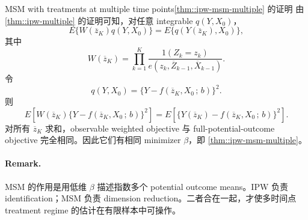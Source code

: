 \begin{exercisesolution}{MSM with treatments at multiple time points}{\cref{thm::ipw-msm-multiple} 的证明}
由 \cref{thm::ipw-multiple} 的证明可知，对任意 integrable $q(Y,X_0)$，
\[
E\{W(\overline z_K)q(Y,X_0)\}
=
E\{q(Y(\overline z_K),X_0)\},
\]
其中
\[
W(\overline z_K)
=
\prod_{k=1}^K
\frac{1(Z_k=z_k)}
{e(z_k,\overline Z_{k-1},\overline X_{k-1})}.
\]
令
\[
q(Y,X_0)=\{Y-f(\overline z_K,X_0\,;\,b)\}^2.
\]
则
\[
E\left[
W(\overline z_K)\{Y-f(\overline z_K,X_0\,;\,b)\}^2
\right]
=
E\left[
\{Y(\overline z_K)-f(\overline z_K,X_0\,;\,b)\}^2
\right].
\]
对所有 $\overline z_K$ 求和，observable weighted objective 与 full-potential-outcome objective 完全相同。因此它们有相同 minimizer $\beta$，即 \cref{thm::ipw-msm-multiple}。

\paragraph{Remark.}
MSM 的作用是用低维 $\beta$ 描述指数多个 potential outcome means。IPW 负责 identification；MSM 负责 dimension reduction。二者合在一起，才使多时间点 treatment regime 的估计在有限样本中可操作。
\end{exercisesolution}

